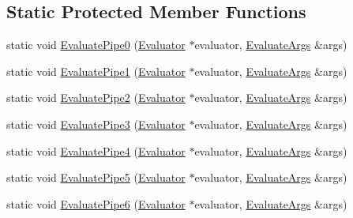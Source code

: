 \subsection*{Static Protected Member Functions}
\begin{DoxyCompactItemize}
\item 
static void \hyperlink{classfractal_1_1Evaluator_a01d3e00a030bc70c5e217f193bf25841}{Evaluate\+Pipe0} (\hyperlink{classfractal_1_1Evaluator}{Evaluator} $\ast$evaluator, \hyperlink{classfractal_1_1EvaluateArgs}{Evaluate\+Args} \&args)
\item 
static void \hyperlink{classfractal_1_1Evaluator_a37874e270a3691656a3840f3d6e87d8d}{Evaluate\+Pipe1} (\hyperlink{classfractal_1_1Evaluator}{Evaluator} $\ast$evaluator, \hyperlink{classfractal_1_1EvaluateArgs}{Evaluate\+Args} \&args)
\item 
static void \hyperlink{classfractal_1_1Evaluator_a3e189048bf105581682a2dad0cd5d951}{Evaluate\+Pipe2} (\hyperlink{classfractal_1_1Evaluator}{Evaluator} $\ast$evaluator, \hyperlink{classfractal_1_1EvaluateArgs}{Evaluate\+Args} \&args)
\item 
static void \hyperlink{classfractal_1_1Evaluator_a110e52128446e4a05007ba8a4660a665}{Evaluate\+Pipe3} (\hyperlink{classfractal_1_1Evaluator}{Evaluator} $\ast$evaluator, \hyperlink{classfractal_1_1EvaluateArgs}{Evaluate\+Args} \&args)
\item 
static void \hyperlink{classfractal_1_1Evaluator_a0d2aaa3679819e39c7627319179d66d5}{Evaluate\+Pipe4} (\hyperlink{classfractal_1_1Evaluator}{Evaluator} $\ast$evaluator, \hyperlink{classfractal_1_1EvaluateArgs}{Evaluate\+Args} \&args)
\item 
static void \hyperlink{classfractal_1_1Evaluator_aea59965bbba49d9ccd91dfe81ede68d2}{Evaluate\+Pipe5} (\hyperlink{classfractal_1_1Evaluator}{Evaluator} $\ast$evaluator, \hyperlink{classfractal_1_1EvaluateArgs}{Evaluate\+Args} \&args)
\item 
static void \hyperlink{classfractal_1_1Evaluator_a79328ff78b4cc4cb8f712656cb9cfd82}{Evaluate\+Pipe6} (\hyperlink{classfractal_1_1Evaluator}{Evaluator} $\ast$evaluator, \hyperlink{classfractal_1_1EvaluateArgs}{Evaluate\+Args} \&args)
\end{DoxyCompactItemize}
